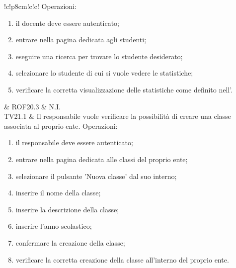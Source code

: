 \documentclass[a4paper, titlepage]{article}
\begin{document}
\begin{tabella}{!{\VRule}c!{\VRule}p{8cm}!{\VRule}c!{\VRule}c!{\VRule}}
		Operazioni:
		{\begin{enumerate}
				\item il docente deve essere autenticato; 
				\item entrare nella pagina dedicata agli studenti;
				\item eseguire una ricerca per trovare lo studente desiderato; 
				\item selezionare lo studente di cui si vuole vedere le statistiche;
				\item verificare la corretta visualizzazione delle statistiche come definito nell’\ARdoc.
		\end{enumerate}
		}
	& ROF20.3 & N.I.
	\\
	TV21.1 &
		Il responsabile vuole verificare la possibilità di creare una classe associata al proprio ente.
		\newline \newline
		Operazioni:
		{\begin{enumerate}
				\item il responsabile deve essere autenticato;
				\item entrare nella pagina dedicata alle classi del proprio ente;
				\item selezionare il pulsante 'Nuova classe' dal suo interno;
				\item inserire il nome della classe;
				\item inserire la descrizione della classe;
				\item inserire l’anno scolastico;
				\item confermare la creazione della classe;
				\item verificare la corretta creazione della classe all’interno del proprio ente.
				  

\end{enumerate}}
\end{tabella}
\end{document}
